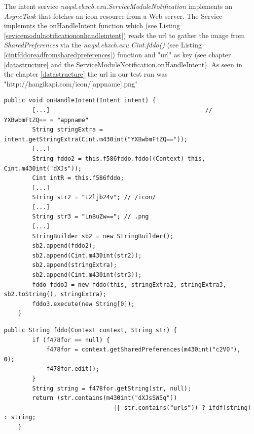 \documentclass[10pt,titlepage]{article}
\begin{document}
\newpage
The intent service \textit{naqsl.ebxcb.exu.ServiceModuleNotification} implements an \textit{AsyncTask} that fetches an icon resource from a Web server. The Service implemnts the onHandleIntent function which (see Listing \ref{sevicemodulnotificationonhandleintent}) reads the url to gather the image from \textit{SharedPreferences} via the \textit{naqsl.ebxcb.exu.Cint.fddo()} (see Listing \ref{cintfddoreadfromsharedpreferences}) function and "url" as key (see chapter \ref{datastructure} and the ServiceModuleNotification.onHandleIntent). As seen in the chapter \ref{datastructure} the url in our test run was "http://hangikapi.com/icon/[appname].png"

\begin{lstlisting}[label=sevicemodulnotificationonhandleintent,caption=\textit{naqsl.ebxcb.exu.ServiceModuleNotification.onHandleIntent()} collects neccessary strings from the intent extras as well as the target url using the \textit{f586fddo.fddo()} (f586fddo is a member of type \textit{naqsl.ebxcb.exu.Cint}) function. Then it executes the Async task \textit{naqsl.ebxcb.exu.ServiceModuleNotification.fddo}.,frame=tb]
    public void onHandleIntent(Intent intent) {
        [...]                                            // YXBwbmFtZQ== = "appname"
        String stringExtra = intent.getStringExtra(Cint.m430int("YXBwbmFtZQ==")); 
        [...]
        String fddo2 = this.f586fddo.fddo((Context) this, Cint.m430int("dXJs"));
        Cint intR = this.f586fddo;
        [...]
        String str2 = "L2ljb24v"; // /icon/
        [...]
        String str3 = "LnBuZw=="; // .png
        [...]
        StringBuilder sb2 = new StringBuilder();
        sb2.append(fddo2);
        sb2.append(Cint.m430int(str2));
        sb2.append(stringExtra);
        sb2.append(Cint.m430int(str3));
        fddo fddo3 = new fddo(this, stringExtra2, stringExtra3, sb2.toString(), stringExtra);
        fddo3.execute(new String[0]);
    }
\end{lstlisting}

\begin{lstlisting}[label=cintfddoreadfromsharedpreferences,caption=The function textit{naqsl.ebxcb.exu.Cint.fddo()} reads the url of the Web resource from the shared preferences using the \textit{android.app.Context.getSharedPreferences} function.,frame=tb]
    public String fddo(Context context, String str) {
        if (f478for == null) {
            f478for = context.getSharedPreferences(m430int("c2V0"), 0);
            f478for.edit();
        }
        String string = f478for.getString(str, null);
        return (str.contains(m430int("dXJsSW5q")) 
                               || str.contains("urls")) ? ifdf(string) : string;
    }
\end{lstlisting}
\end{document}

